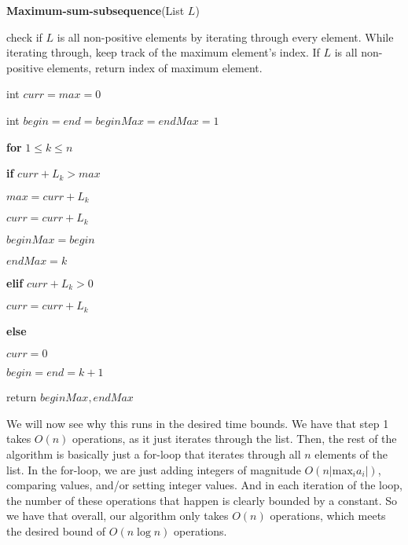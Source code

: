 \documentclass{article}
\begin{document}
\vspace{5mm}

\textbf{Maximum-sum-subsequence}(List $L$)
\begin{enumerate}
    \item check if $L$ is all non-positive elements by iterating through every
        element. While iterating through, keep track of the maximum element's index.
        If $L$ is all non-positive elements, return index of maximum element.
    \item int $curr = max = 0$
    \item int $begin = end = beginMax = endMax = 1$
    \item \textbf{for} $1 \leq k \leq n$
    {\setlength\itemindent{25pt} \item \textbf{if} $curr + L_k > max$ }
    {\setlength\itemindent{50pt} \item $max = curr + L_k$ }
    {\setlength\itemindent{50pt} \item $curr = curr + L_k$ }
    {\setlength\itemindent{50pt} \item $beginMax = begin$ }
    {\setlength\itemindent{50pt} \item $endMax = k$ }
    {\setlength\itemindent{25pt} \item \textbf{elif} $curr + L_k > 0$ }
    {\setlength\itemindent{50pt} \item $curr = curr + L_k$ }
    {\setlength\itemindent{25pt} \item \textbf{else} }
    {\setlength\itemindent{50pt} \item $curr = 0$ }
    {\setlength\itemindent{50pt} \item $begin = end = k+1$ }
    \item return $beginMax, endMax$
\end{enumerate}

\vspace{5mm}
We will now see why this runs in the desired time bounds. We have that step 1
takes $O(n)$ operations, as it just iterates through the list. Then, the rest of
the algorithm is basically just a for-loop that iterates through all $n$
elements of the list. In the for-loop, we are just adding integers of
magnitude $O(n|\text{max$_i a_i$}|)$, comparing values, and/or setting integer values.
And in each iteration of the loop, the number of these operations that happen is
clearly bounded by a constant. So we have that overall, our algorithm only takes
$O(n)$ operations, which meets the desired bound of $O(n\log n)$ operations.
\end{document}
